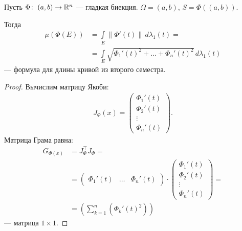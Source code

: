 \begin{exmpl}
 Пусть $\Phi \colon\; (a, b) \to \mathbb{R}^{n}$ --- гладкая биекция. $\Omega = (a,b)$, $S = \Phi\left( (a, b) \right)$.

 Тогда
 \begin{align*}
  \mu(\Phi(E)) &= \int\limits_{E} \left\| \Phi'(t) \right\| \, d\lambda_1(t) = \\
  &= \int\limits_{E} \sqrt{ \Phi_1'(t)^{2} + \ldots + \Phi_n'(t)^{2} } \, d\lambda_1(t)
 \end{align*}  --- формула для длины кривой из второго семестра.
\end{exmpl}
\begin{proof}
 Вычислим матрицу Якоби:
 \begin{align*}
  J_{\Phi}(x) = \begin{pmatrix}
   \Phi_1'(t) \\
   \Phi_2'(t) \\
   \vdots \\
   \Phi_n'(t) 
  \end{pmatrix}
 .\end{align*} Матрица Грама равна:
 \begin{align*}
  G_{\Phi(x)} &= J^{\top}_{\Phi} J_{\Phi} = \\
  &= \begin{pmatrix}
   \Phi_1'(t) & \ldots & \Phi_n'(t)
  \end{pmatrix} \cdot \begin{pmatrix}
   \Phi_1'(t) \\
   \Phi_2'(t) \\
   \vdots \\
   \Phi_n'(t) 
  \end{pmatrix} = \\
  &= \left( \sum_{k=1}^{n} (\Phi_k'(t)^{2}) \right)
 \end{align*} --- матрица $1 \times 1$.
\end{proof}

